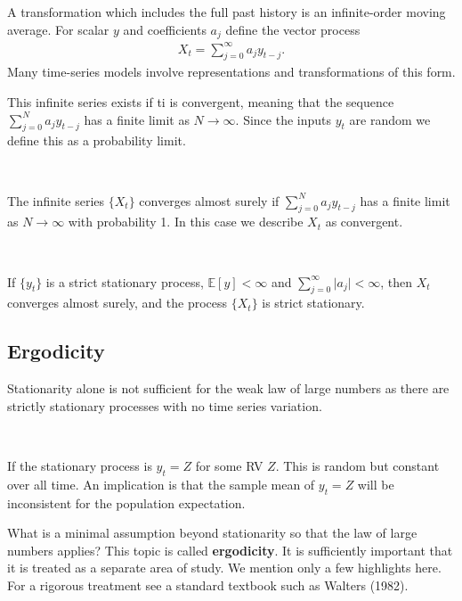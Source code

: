 A transformation which includes the full past history is an infinite-order moving average.
For scalar $y$ and coefficients $a_j$ define the vector process
\begin{gather*}
    X_t = \sum_{j=0}^{\infty} a_j y_{t-j}.
\end{gather*}
Many time-series models involve representations and transformations of this form.

This infinite series exists if ti is convergent, meaning that the sequence $\sum_{j=0}^{N}a_j y_{t-j}$
has a finite limit as $N \to \infty$.  Since the inputs $y_t$ are random we define this as a probability limit.

\begin{definition}[Convergence]\label{def:convergence}
    \

    The infinite series $\{X_t\}$ converges almost surely if $\sum_{j=0}^{N} a_j y_{t-j}$
    has a finite limit as $N \to \infty$ with probability 1.
    In this case we describe $X_t$ as convergent.
    
\end{definition}
\begin{theorem}\label{thm:convergence-stationary}
    \

    If $\{y_t\}$ is a strict stationary process, $\mathbb{E}[y] < \infty$ 
    and $\sum_{j=0}^{\infty} \vert a_j \vert < \infty$,
    then $X_t$ converges almost surely,
    and the process $\{X_t\}$ is strict stationary.  
\end{theorem}

\subsection{Ergodicity}
\label{sec:ergodicity}

Stationarity alone is not sufficient for the weak law of large numbers as there are strictly stationary
processes with no time series variation.

\begin{eg}
    \
    
    If the stationary process is $y_t = Z$ for some RV $Z$.
    This is random but constant over all time. 
    An implication is that the sample mean of $y_t = Z$ will be inconsistent for the population expectation.
\end{eg}

What is a minimal assumption beyond stationarity so that the law of large numbers applies? This
topic is called \textbf{ergodicity}.
It is sufficiently important that it is treated as a separate area of study. We
mention only a few highlights here. For a rigorous treatment see a standard textbook such as Walters
(1982).

